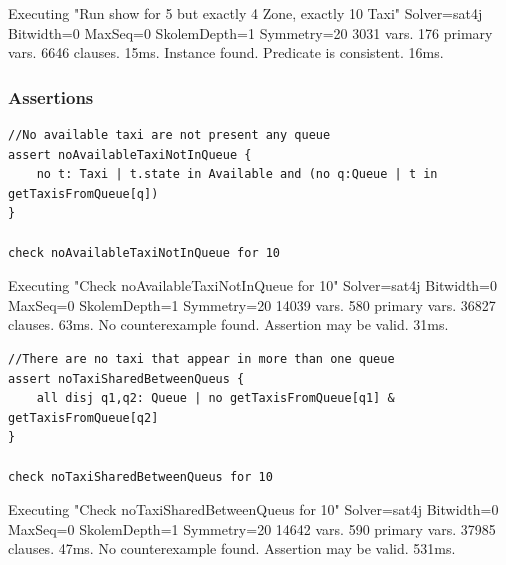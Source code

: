 \begin{framed}
Executing "Run show for 5 but exactly 4 Zone, exactly 10 Taxi" 
Solver=sat4j Bitwidth=0 MaxSeq=0 SkolemDepth=1 Symmetry=20 
3031 vars. 176 primary vars. 6646 clauses. 15ms. 
Instance found. Predicate is consistent. 16ms.
\end{framed}


\subsubsection{Assertions}

\begin{lstlisting}[breaklines=true,showstringspaces=false]
//No available taxi are not present any queue 
assert noAvailableTaxiNotInQueue { 	
	no t: Taxi | t.state in Available and (no q:Queue | t in getTaxisFromQueue[q]) 
}

check noAvailableTaxiNotInQueue for 10
\end{lstlisting}


\begin{framed}
Executing "Check noAvailableTaxiNotInQueue for 10" 
Solver=sat4j Bitwidth=0 MaxSeq=0 SkolemDepth=1 Symmetry=20 
14039 vars. 580 primary vars. 36827 clauses. 63ms. 
No counterexample found. Assertion may be valid. 31ms.
\end{framed}

\begin{lstlisting}[breaklines=true]
//There are no taxi that appear in more than one queue
assert noTaxiSharedBetweenQueus { 	
	all disj q1,q2: Queue | no getTaxisFromQueue[q1] &  getTaxisFromQueue[q2]  
} 

check noTaxiSharedBetweenQueus for 10
\end{lstlisting}


\begin{framed}
Executing "Check noTaxiSharedBetweenQueus for 10" 
Solver=sat4j Bitwidth=0 MaxSeq=0 SkolemDepth=1 Symmetry=20 
14642 vars. 590 primary vars. 37985 clauses. 47ms. 
No counterexample found. Assertion may be valid. 531ms.
\end{framed}

